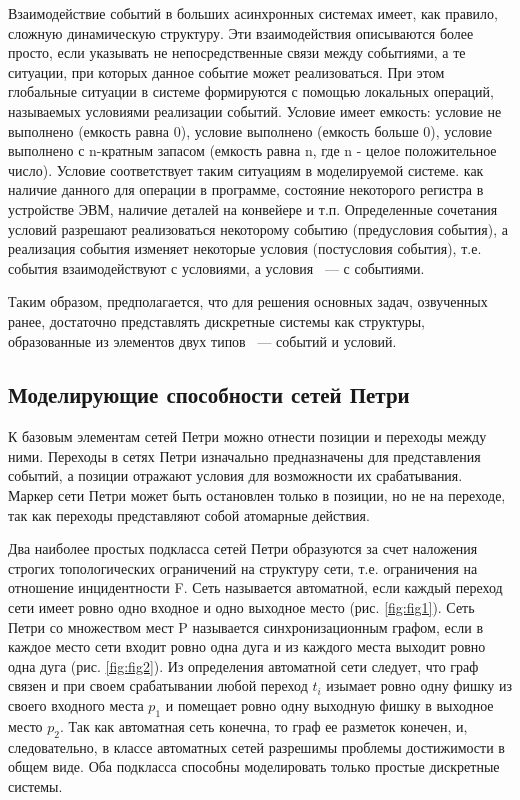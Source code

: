 Взаимодействие событий в больших асинхронных системах имеет, как правило, сложную динамическую структуру. Эти взаимодействия описываются более просто, если указывать не непосредственные связи между событиями, а те ситуации, при которых данное событие может реализоваться. При этом глобальные ситуации в системе формируются с помощью локальных операций, называемых условиями реализации событий. Условие имеет емкость: условие не выполнено (емкость равна 0), условие выполнено (емкость больше 0), условие выполнено с n-кратным запасом
(емкость равна n, где n - целое положительное число). Условие соответствует таким ситуациям в моделируемой системе. как наличие данного для операции в программе, состояние некоторого регистра в устройстве ЭВМ, наличие деталей на конвейере и т.п. Определенные сочетания условий разрешают реализоваться некоторому событию (предусловия события), а реализация события изменяет некоторые условия (постусловия события), т.е. события взаимодействуют с условиями, а условия ~--- с событиями.

Таким образом, предполагается, что для решения основных задач, озвученных ранее, достаточно представлять дискретные системы как структуры, образованные из элементов двух типов ~--- событий и условий.

\subsection{Моделирующие способности сетей Петри}

К базовым элементам сетей Петри можно отнести позиции и переходы между ними. Переходы в сетях Петри изначально предназначены для представления событий, а позиции отражают условия для возможности их срабатывания. Маркер сети Петри может быть остановлен только в позиции, но не на переходе, так как переходы представляют собой атомарные действия.

Два наиболее простых подкласса сетей Петри образуются за счет наложения строгих топологических ограничений на структуру сети, т.е. ограничения на отношение инцидентности F. Сеть называется автоматной, если каждый переход сети имеет ровно одно входное и одно выходное место (рис. \ref{fig:fig1}). Сеть Петри со множеством мест P называется синхронизационным графом, если в каждое место сети входит ровно одна дуга и из каждого места выходит ровно одна дуга (рис. \ref{fig:fig2}). Из определения автоматной сети следует, что граф связен и при своем срабатывании любой переход $ t_{i} $ изымает ровно одну фишку из своего входного места $ p_{1} $ и помещает ровно одну выходную фишку в выходное место $ p_{2} $. Так как автоматная сеть конечна, то граф ее разметок конечен, и, следовательно, в классе автоматных сетей разрешимы проблемы достижимости в общем виде. Оба подкласса способны моделировать только простые дискретные системы.

